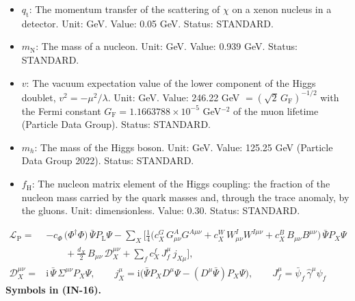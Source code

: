 \documentclass[
  10pt,
]{article}
\begin{document}
\begin{itemize}
  \(\Delta m_{32}^2\)); \(\Delta m^2\) without labels the difference of
  the two states of a resonance, \(m_2^2 - m_1^2\), multiplied by
  \(v_{\mathrm{loc}}^2/v^2\) where this differs from 1; \(m\) without a
  label the mass of a mode of a field of the bulk as the fold sees it,
  \(m^2 = \omega^2 - k^2\); for the W and Z bosons their complex pole
  mass, \(m^2 = m_0^2 - \mathrm{i}m_0\Gamma_{\mathrm{bulk}}\) to the
  leading order; in the relic abundance of the particles \(\chi\) their
  mass. Unit: GeV. Status: STANDARD.
\item
  \(q_{\mathrm{t}}\): The momentum transfer of the scattering of
  \(\chi\) on a xenon nucleus in a detector. Unit: GeV. Value: 0.05 GeV.
  Status: STANDARD.
\item
  \(m_{\mathrm{N}}\): The mass of a nucleon. Unit: GeV. Value: 0.939
  GeV. Status: STANDARD.
\item
  \(v\): The vacuum expectation value of the lower component of the
  Higgs doublet, \(v^2 = -\mu^2/\lambda\). Unit: GeV. Value: 246.22 GeV
  \(= (\sqrt2\,G_{\mathrm{F}})^{-1/2}\) with the Fermi constant
  \(G_{\mathrm{F}} = 1.1663788\times10^{-5}\) GeV\(^{-2}\) of the muon
  lifetime (Particle Data Group). Status: STANDARD.
\item
  \(m_h\): The mass of the Higgs boson. Unit: GeV. Value: 125.25 GeV
  (Particle Data Group 2022). Status: STANDARD.
\item
  \(f_{\mathrm{H}}\): The nucleon matrix element of the Higgs coupling:
  the fraction of the nucleon mass carried by the quark masses and,
  through the trace anomaly, by the gluons. Unit: dimensionless. Value:
  0.30. Status: STANDARD.
\end{itemize}

\[
\begin{aligned}
\mathcal{L}_{\mathrm{P}} = {}&-c_\Phi\,\big(\Phi^\dagger\Phi\big)\,\bar\Psi P_{\mathrm{L}}\Psi
 - \sum_{X}\Big[\frac14\big(c^{G}_X\,G^A_{\mu\nu}G^{A\mu\nu} + c^{W}_X\,W^I_{\mu\nu}W^{I\mu\nu}
 + c^{B}_X\,B_{\mu\nu}B^{\mu\nu}\big)\,\bar\Psi P_X\Psi\\
&\qquad + \frac{d_X}{2}\,B_{\mu\nu}\,\mathcal{D}_X^{\mu\nu} + \sum_{f} c^{f}_X\,J_f^\mu\,j_{X\mu}\Big],\\
\mathcal{D}_X^{\mu\nu} = {}&\mathrm{i}\,\bar\Psi\,\Sigma^{\mu\nu}P_X\Psi,\qquad
j_X^\mu = \mathrm{i}\big(\bar\Psi P_X D^\mu\Psi - (D^\mu\bar\Psi)P_X\Psi\big),\qquad
J_f^\mu = \bar\psi_f\,\hat\gamma^\mu\psi_f
\end{aligned} \tag{IN-16}
\] \textbf{Symbols in (IN-16).}
\end{document}
